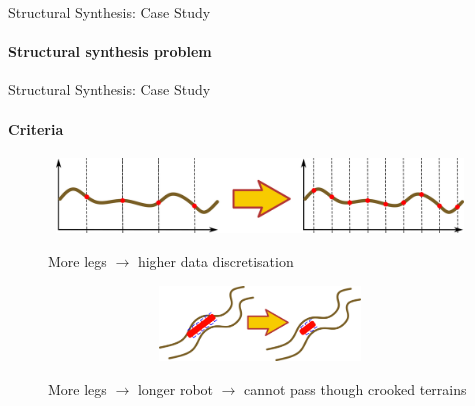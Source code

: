 \documentclass[aspectratio=169]{beamer}
\begin{document}
\begin{frame}[t]{Structural Synthesis: Case Study}
    \framesubtitle{Structural synthesis problem}
\end{frame}

\begin{frame}[t]{Structural Synthesis: Case Study}
\framesubtitle{Criteria}
\vspace{-0.6cm}
\begin{figure}[H]
    \begin{minipage}{0.58\textwidth}
        \centering\includegraphics[height=2cm,width=1\textwidth,keepaspectratio]{f1.png}
    \end{minipage}\hfill
    \begin{minipage}{0.40\textwidth}
        More legs $\rightarrow$ higher data discretisation
        \label{fig:f1.png}
    \end{minipage}
\end{figure}
\vspace{-0.6cm}

\begin{figure}[H]
    \begin{minipage}{0.58\textwidth}
        \centering\includegraphics[height=2cm,width=1\textwidth,keepaspectratio]{f2.png}
    \end{minipage}\hfill
    \begin{minipage}{0.40\textwidth}
        More legs $\rightarrow$ longer robot $\rightarrow$ cannot pass though crooked terrains
        \label{fig:f2.png}
    \end{minipage}
\end{figure}
\vspace{-0.6cm}


\end{frame}
\end{document}
